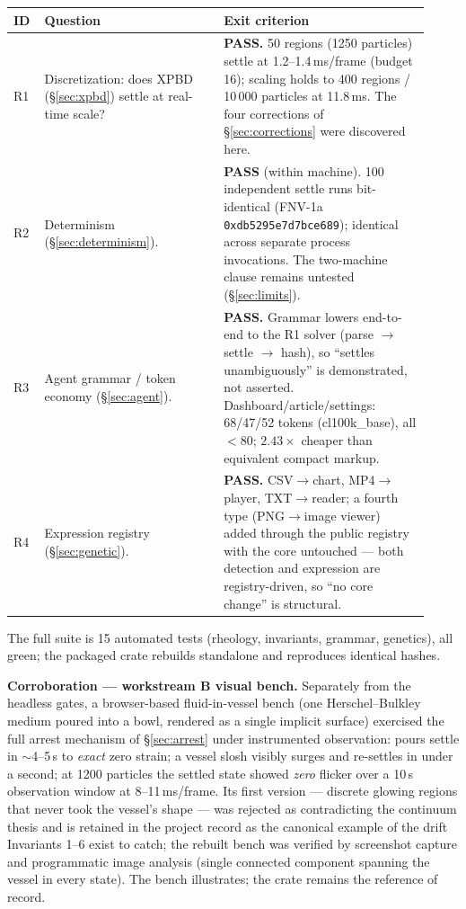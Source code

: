 \documentclass[11pt]{article}
\begin{document}
\begin{center}
\begin{tabular}{@{}p{0.06\linewidth}p{0.40\linewidth}p{0.46\linewidth}@{}}
\toprule
\textbf{ID} & \textbf{Question} & \textbf{Exit criterion} \\
\midrule
R1 & Discretization: does XPBD (\S\ref{sec:xpbd}) settle at real-time scale? &
\textbf{PASS.} 50 regions (1250 particles) settle at 1.2--1.4\,ms/frame (budget 16); scaling
holds to 400 regions / 10\,000 particles at 11.8\,ms. The four corrections of
\S\ref{sec:corrections} were discovered here. \\
R2 & Determinism (\S\ref{sec:determinism}). &
\textbf{PASS} (within machine). 100 independent settle runs bit-identical (FNV-1a
\texttt{0xdb5295e7d7bce689}); identical across separate process invocations. The two-machine
clause remains untested (\S\ref{sec:limits}). \\
R3 & Agent grammar / token economy (\S\ref{sec:agent}). &
\textbf{PASS.} Grammar lowers end-to-end to the R1 solver (parse $\to$ settle $\to$ hash), so
``settles unambiguously'' is demonstrated, not asserted. Dashboard/article/settings: 68/47/52
tokens (cl100k\_base), all $<80$; $2.43\times$ cheaper than equivalent compact markup. \\
R4 & Expression registry (\S\ref{sec:genetic}). &
\textbf{PASS.} CSV$\to$chart, MP4$\to$player, TXT$\to$reader; a fourth type (PNG$\to$image
viewer) added through the public registry with the core untouched --- both detection and
expression are registry-driven, so ``no core change'' is structural. \\
\bottomrule
\end{tabular}
\end{center}

\noindent The full suite is 15 automated tests (rheology, invariants, grammar, genetics),
all green; the packaged crate rebuilds standalone and reproduces identical hashes.

\medskip
\noindent\textbf{Corroboration --- workstream B visual bench.} Separately from the headless
gates, a browser-based fluid-in-vessel bench (one Herschel--Bulkley medium poured into a bowl,
rendered as a single implicit surface) exercised the full arrest mechanism of \S\ref{sec:arrest}
under instrumented observation: pours settle in $\sim$4--5\,s to \emph{exact} zero strain; a
vessel slosh visibly surges and re-settles in under a second; at 1200 particles the settled
state showed \emph{zero} flicker over a 10\,s observation window at 8--11\,ms/frame. Its first
version --- discrete glowing regions that never took the vessel's shape --- was rejected as
contradicting the continuum thesis and is retained in the project record as the canonical
example of the drift Invariants 1--6 exist to catch; the rebuilt bench was verified by
screenshot capture and programmatic image analysis (single connected component spanning the
vessel in every state). The bench illustrates; the crate remains the reference of record.
\end{document}
